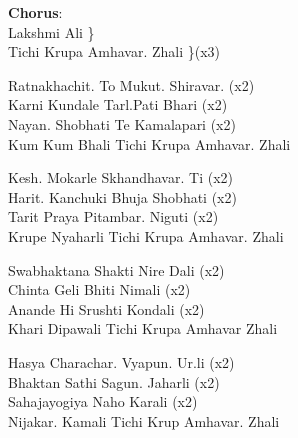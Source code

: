 
{\bf Chorus}: \\
Lakshmi Ali \} \\
Tichi Krupa Amhavar. Zhali \}(x3) \linebreak[2]

Ratnakhachit. To Mukut. Shiravar. (x2) \\
Karni Kundale Tarl.Pati Bhari (x2) \\
Nayan. Shobhati Te Kamalapari (x2) \\
Kum Kum Bhali Tichi Krupa Amhavar. Zhali \linebreak[2]


Kesh. Mokarle Skhandhavar. Ti (x2) \\
Harit. Kanchuki Bhuja Shobhati (x2) \\
Tarit Praya Pitambar. Niguti (x2) \\
Krupe Nyaharli Tichi Krupa Amhavar. Zhali \linebreak[2]

Swabhaktana Shakti Nire Dali (x2) \\
Chinta Geli Bhiti Nimali (x2) \\
Anande Hi Srushti Kondali (x2) \\
Khari Dipawali Tichi Krupa Amhavar Zhali \linebreak[2]



Hasya Charachar. Vyapun. Ur.li (x2) \\
Bhaktan Sathi Sagun. Jaharli (x2) \\
Sahajayogiya Naho Karali (x2) \\
Nijakar. Kamali Tichi Krup Amhavar. Zhali

\newpage